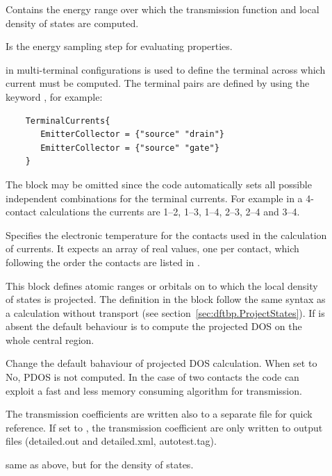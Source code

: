 \begin{description}


\item[] Contains the energy range over
  which the transmission function and local density of states are computed.
\item[] Is the energy sampling step for
  evaluating properties.
\item[] in multi-terminal configurations is used to define
  the terminal across which current must be computed. The terminal pairs are
  defined by using the keyword , for example:
   \begin{verbatim}
    TerminalCurrents{
       EmitterCollector = {"source" "drain"}
       EmitterCollector = {"source" "gate"}
    }
  \end{verbatim}
  The block  may be omitted since the code automatically
  sets all possible independent combinations for the terminal currents. For
  example in a 4-contact calculations the currents are 1--2, 1--3, 1--4, 2--3,
  2--4 and 3--4.
\item[] Specifies the electronic
  temperature for the contacts used in the calculation of currents. It expects
  an array of real values, one per contact, which following the order the
  contacts are listed in .
\item[] \label{Region} This block defines atomic ranges or orbitals
  on to which the local density of states is projected. The definition in the
  block follow the same syntax as a \dftbp{} calculation without transport (see
  section~\ref{sec:dftbp.ProjectStates}). If  is absent the default
  behaviour is to compute the projected DOS on the whole central region.
\item[] Change the default bahaviour of projected DOS calculation.
  When set to No, PDOS is not computed. In the case of two contacts
  the code can exploit a fast and less memory consuming algorithm for transmission.
\item[] The transmission coefficients are written also to a
  separate file for quick reference. If set to , the transmission
  coefficient are only written to \dftbp{} output files (detailed.out and
  detailed.xml, autotest.tag).
\item[] same as above, but for the density of states.

\end{description}

